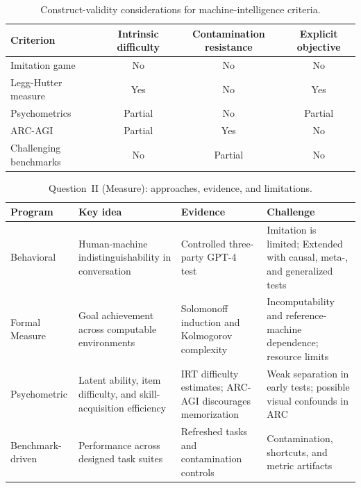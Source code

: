 \documentclass[acmsmall,screen,review,anonymous]{acmart}
\begin{document}
\begin{table}[h]
\caption{Construct-validity considerations for machine-intelligence criteria.}
\label{tab:conditions}
\centering
\small
\setlength{\tabcolsep}{4pt}
\renewcommand{\arraystretch}{1.15}
\begin{tabular}{lccc}
\toprule
Criterion & Intrinsic difficulty & Contamination resistance & Explicit objective \\
\midrule
Imitation game~\citep{turing1950} & No & No & No \\
Legg-Hutter measure~\citep{legghutter2007} & Yes & No & Yes \\
Psychometrics~\citep{hernandezorallo2017} & Partial & No & Partial \\
ARC-AGI~\citep{chollet2019measureintelligence} & Partial & Yes & No \\
Challenging benchmarks~\citep{white2025livebench,HLE2026} & No & Partial & No \\
\bottomrule
\end{tabular}
\end{table}


\begin{table}[t]
\caption{Question~II (Measure): approaches, evidence, and limitations.}
\label{tab:measurement-framework}
\centering
\footnotesize
\setlength{\tabcolsep}{3pt}
\renewcommand{\arraystretch}{1.13}
\begin{tabularx}{\textwidth}{p{} Y Y Y}
\toprule
Program & Key idea & Evidence & Challenge \\
\midrule
Behavioral &
Human-machine indistinguishability in conversation~\citep{turing1950} &
Controlled three-party GPT-4 test~\citep{10.1145/3715275.3732108} &
Imitation is limited; Extended with causal, meta-, and generalized tests~\citep{pearl2018, walsh2022metaturingtest, mitropolsky2026generalizedturingtestfoundation} \\
\addlinespace
Formal Measure &
Goal achievement across computable environments~\citep{legghutter2007} &
Solomonoff induction and Kolmogorov complexity~\citep{Solomonoff1964AFT1, Kolmogorov1968ThreeAT} &
Incomputability and reference-machine dependence; resource limits~\citep{leike2015computeaixi, pmlr-v40-Leike15} \\
\addlinespace
Psychometric &
Latent ability, item difficulty, and skill-acquisition efficiency~\citep{hernandezorallo2017, chollet2019measureintelligence} &
IRT difficulty estimates; ARC-AGI discourages memorization~\citep{MARTINEZPLUMED201918, chollet2019measureintelligence} &
Weak separation in early tests; possible visual confounds in ARC~\citep{10.1007/978-3-642-22887-2_13, wang2026reasoningbenchmarktestreasoning} \\
\addlinespace
Benchmark-driven &
Performance across designed task suites &
Refreshed tasks and contamination controls~\citep{white2025livebench, NEURIPS2024_53384f20} &
Contamination, shortcuts, and metric artifacts~\citep{magar-schwartz-2022-data, sclar2024quantifying, schaeffer2023emergent} \\
\bottomrule
\end{tabularx}
\end{table}
\end{document}
